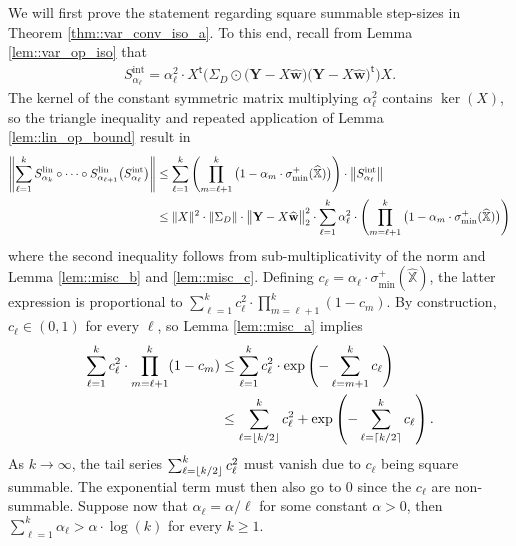 \documentclass{article}
\newcommand*{\bbX}{\mathbb{X}}
\newcommand*{\bfY}{\mathbf{Y}}
\newcommand*{\bfw}{\mathbf{w}}
\newcommand*{\tran}{^{\mathsf{t}}}
\newcommand*{\sigminp}{\sigma_{\mathrm{min}}^+}
\DeclarePairedDelimiter{\norm}{\lVert}{\rVert}
\DeclarePairedDelimiter{\ceil}{\lceil}{\rceil}
\DeclarePairedDelimiter{\floor}{\lfloor}{\rfloor}
\newcommand{\whweight}{\widehat{\bfw}}
\newcommand{\whbbX}{\widehat{\bbX}}
\newcommand{\Slin}{S^{\mathrm{lin}}}
\newcommand{\Sint}{S^{\mathrm{int}}}
\begin{document}
We will first prove the statement regarding square summable step-sizes in
Theorem \ref{thm::var_conv_iso_a}. To this end, recall from Lemma
\ref{lem::var_op_iso} that \begin{align*}
  \Sint_{\alpha_\ell} = \alpha_\ell^2 \cdot X\tran \Bigg(\Sigma_D \odot
  \big(\bfY - X \whweight\big) \big(\bfY - X
  \whweight\big)\tran \Bigg) X.
\end{align*} The kernel of the constant symmetric matrix multiplying
$\alpha_\ell^2$ contains $\ker(X)$, so the triangle inequality and repeated
application of Lemma \ref{lem::lin_op_bound} result in \begin{equation}
  \label{eq::res_bound}
  \begin{split}
    \norm*{\sum_{\ell = 1}^k \Slin_{\alpha_k} \circ \cdots \circ
    \Slin_{\alpha_{\ell + 1}} \big(\Sint_{\alpha_\ell}\big)} &\leq \sum_{\ell =
    1}^k \left(\prod_{m = \ell + 1}^k \big(1 - \alpha_m \cdot
    \sigminp(\whbbX)\big)\right) \cdot \norm[\big]{\Sint_{\alpha_\ell}}\\
    &\leq \norm{X}^2 \cdot \norm{\Sigma_D} \cdot \norm[\big]{\bfY - X
    \whweight}_2^2 \cdot \sum_{\ell = 1}^k \alpha_\ell^2 \cdot \left(\prod_{m =
    \ell + 1}^k \big(1 - \alpha_m \cdot \sigminp(\whbbX)\big)\right)
  \end{split}
\end{equation} where the second inequality follows from sub-multiplicativity of
the norm and Lemma \ref{lem::misc_b} and \ref{lem::misc_c}. Defining $c_\ell =
\alpha_\ell \cdot \sigminp(\whbbX)$, the latter expression is proportional to
$\sum_{\ell = 1}^k c_\ell^2 \cdot \prod_{m = \ell + 1}^k (1 - c_m)$. By
construction, $c_\ell \in (0, 1)$ for every $\ell$, so Lemma \ref{lem::misc_a}
implies \begin{align*}
  \sum_{\ell = 1}^k c_\ell^2 \cdot \prod_{m = \ell + 1}^k (1 - c_m) &\leq
  \sum_{\ell = 1}^k c_{\ell}^2 \cdot \exp\left(- \sum_{\ell = m + 1}^k
  c_\ell\right)\\
  &\leq \sum_{\ell = \floor{k / 2}}^k c_\ell^2 + \exp\left(- \sum_{\ell =
  \ceil{k / 2}}^{k} c_\ell\right).
\end{align*} As $k \to \infty$, the tail series $\sum_{\ell = \floor{k / 2}}^{k}
c_\ell^2$ must vanish due to $c_{\ell}$ being square summable. The exponential
term must then also go to $0$ since the $c_\ell$ are non-summable. Suppose now
that $\alpha_\ell = \alpha / \ell$ for some constant $\alpha > 0$, then
$\sum_{\ell = 1}^k \alpha_\ell > \alpha \cdot \log(k)$ for every $k \geq 1$.
\end{document}
